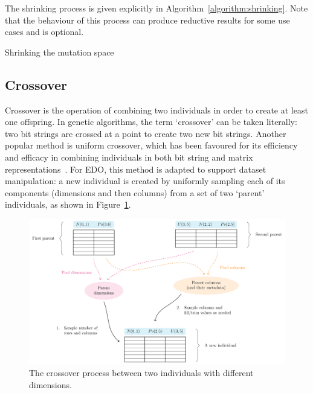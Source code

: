 \documentclass[smallextended]{svjour3}
\newcommand{\balg}[1][htbp]{%
    \begin{algorithm}[#1]\DontPrintSemicolon
}
\newcommand{\ealg}{%
    \end{algorithm}
}
\begin{document}
The shrinking process is given explicitly in
Algorithm~\ref{algorithm:shrinking}. Note that the behaviour of this process can 
produce reductive results for some use cases and is optional.

\balg%

\caption{Shrinking the mutation space}\label{algorithm:shrinking}
\ealg%

\subsection{Crossover}

Crossover is the operation of combining two individuals in order to create at
least one offspring. In genetic algorithms, the term `crossover' can be taken
literally: two bit strings are crossed at a point to create two new bit strings.
Another popular method is uniform crossover, which has been favoured for its
efficiency and efficacy in combining individuals in both bit string and matrix
representations~\cite{Chen2018,Semenkin2012}. For EDO, this method is adapted to
support dataset manipulation: a new individual is created by uniformly sampling
each of its components (dimensions and then columns) from a set of two `parent'
individuals, as shown in Figure~\ref{fig:crossover}.

\begin{figure}[htbp]
    \centering
    \includegraphics[width=\linewidth]{Fig5.pdf}
    \caption{%
        The crossover process between two individuals with different dimensions.
    }\label{fig:crossover}
\end{figure}
\end{document}
